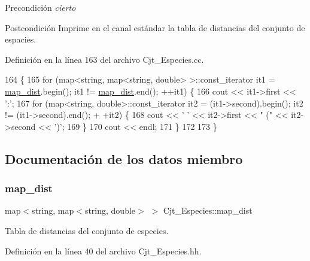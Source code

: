 \begin{DoxyPrecond}{Precondición}
{\itshape cierto} 
\end{DoxyPrecond}
\begin{DoxyPostcond}{Postcondición}
Imprime en el canal estándar la tabla de distancias del conjunto de espacies. 
\end{DoxyPostcond}


Definición en la línea 163 del archivo Cjt\+\_\+\+Especies.\+cc.


\begin{DoxyCode}
164 \{
165     \textcolor{keywordflow}{for} (map<\textcolor{keywordtype}{string}, map<string, double> >::const\_iterator it1 = \hyperlink{class_cjt___especies_a9b104014aea0c1472ba4e7d7fc785e9a}{map\_dist}.begin(); it1 != 
      \hyperlink{class_cjt___especies_a9b104014aea0c1472ba4e7d7fc785e9a}{map\_dist}.end(); ++it1) \{
166         cout << it1->first << \textcolor{charliteral}{':'};
167         \textcolor{keywordflow}{for} (map<string, double>::const\_iterator it2 = (it1->second).begin(); it2 != (it1->second).end(); +
      +it2) \{
168             cout << \textcolor{charliteral}{' '} << it2->first << \textcolor{stringliteral}{" ("} << it2->second << \textcolor{charliteral}{')'};
169         \}
170         cout << endl;
171     \}
172     
173 \}
\end{DoxyCode}


\subsection{Documentación de los datos miembro}
\mbox{\label{class_cjt___especies_a9b104014aea0c1472ba4e7d7fc785e9a}} 
\subsubsection{\texorpdfstring{map\+\_\+dist}{map\_dist}}
{\footnotesize\ttfamily map$<$string, map$<$string, double$>$ $>$ Cjt\+\_\+\+Especies\+::map\+\_\+dist\hspace{0.3cm}{\ttfamily [private]}}



Tabla de distancias del conjunto de especies. 



Definición en la línea 40 del archivo Cjt\+\_\+\+Especies.\+hh.

